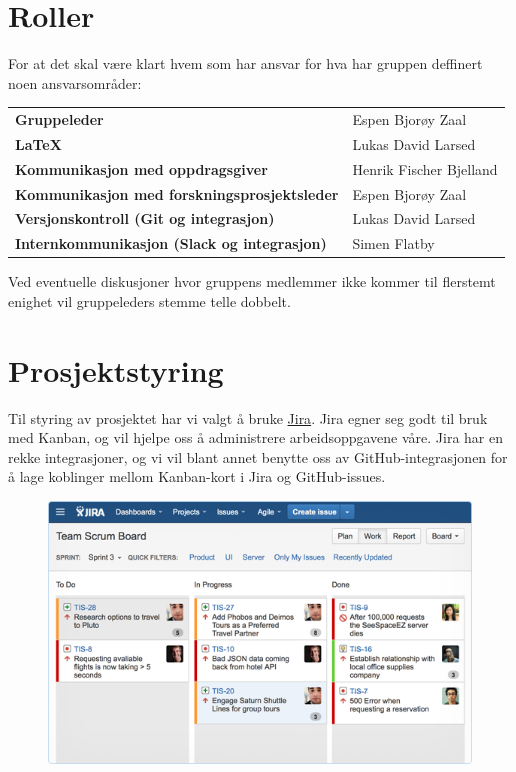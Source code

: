\section{Roller}
For at det skal være klart hvem som har ansvar for hva har gruppen deffinert noen ansvarsområder:
\begin{flushleft}
\renewcommand{\arraystretch}{1.5}
\begin{tabular}[ht]{@{}ll@{}}
\textbf{Gruppeleder} & Espen Bjorøy Zaal \\
\textbf{\LaTeX} & Lukas David Larsed \\
\textbf{Kommunikasjon med oppdragsgiver} & Henrik Fischer Bjelland \\
\textbf{Kommunikasjon med forskningsprosjektsleder} & Espen Bjorøy Zaal \\
\textbf{Versjonskontroll (Git og integrasjon)} & Lukas David Larsed \\
\textbf{Internkommunikasjon (Slack og integrasjon)} & Simen Flatby \\
\end{tabular} 
\end{flushleft}
Ved eventuelle diskusjoner hvor gruppens medlemmer ikke kommer til flerstemt enighet vil gruppeleders stemme telle dobbelt.

\section{Prosjektstyring}
Til styring av prosjektet har vi valgt å bruke \href{https://www.atlassian.com/software/jira}{Jira}. Jira egner seg godt til bruk med Kanban, og vil hjelpe oss å administrere arbeidsoppgavene våre. Jira har en rekke integrasjoner, og vi vil blant annet benytte oss av GitHub-integrasjonen for å lage koblinger mellom Kanban-kort i Jira og GitHub-issues.
\cleardoublepage
\begin{figure}[ht]
\begin{center}
\includegraphics[scale=0.65, keepaspectratio]{./img/arbeidsmetodikk/jira_kanban.png}
\end{center}
\end{figure}
